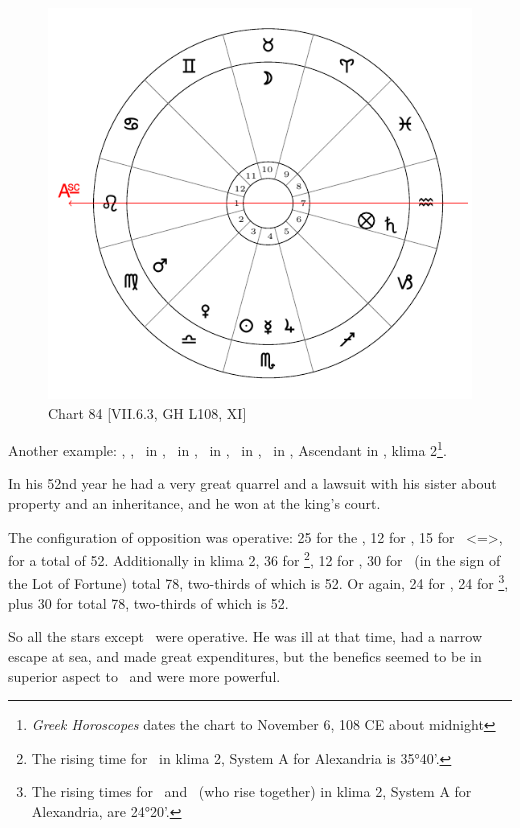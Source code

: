\newpage
\begin{figure}
\centering
\vspace{0pt}
\includegraphics[width=.68\textwidth]{charts/7_6_03}
\caption{Chart 84 [VII.6.3, GH L108, XI]}
\label{fig:chart84}
\end{figure} 

Another example: \Sun, \Mercury, \Jupiter\, in \Scorpio, \Moon\, in \Taurus, \Saturn\, in \Aquarius, \Mars\, in \Virgo, \Venus\, in \Libra, Ascendant in \Leo, klima 2\footnote{\textit{Greek Horoscopes} dates the chart to November 6, 108 CE about midnight}.

In his 52nd year he had a very great quarrel and a lawsuit with his sister about property and an inheritance, and he won at the king’s court. 

The configuration of opposition was operative: 25 for the \Moon, 12 for \Jupiter, 15 for \Scorpio\, <=\Mars>, for a
total of 52. Additionally in klima 2, 36 for \Scorpio\footnote{The rising time for \Scorpio\, in klima 2, System A for Alexandria is 35°40'.}, 12 for \Jupiter, 30 for \Saturn\, (in the sign of the Lot of Fortune) total 78, two-thirds of which is 52. Or again, 24 for \Taurus, 24 for \Aquarius\footnote{The rising times for \Taurus\, and \Aquarius\, (who rise together) in klima 2, System A for Alexandria, are 24°20'.}, plus 30 for \Saturn total 78, two-thirds of which is 52. 

So all the stars except \Mars\, were operative. He was ill at that time, had a narrow escape at sea, and made great expenditures, but the benefics seemed to be in superior aspect to \Saturn\, and were more powerful.

